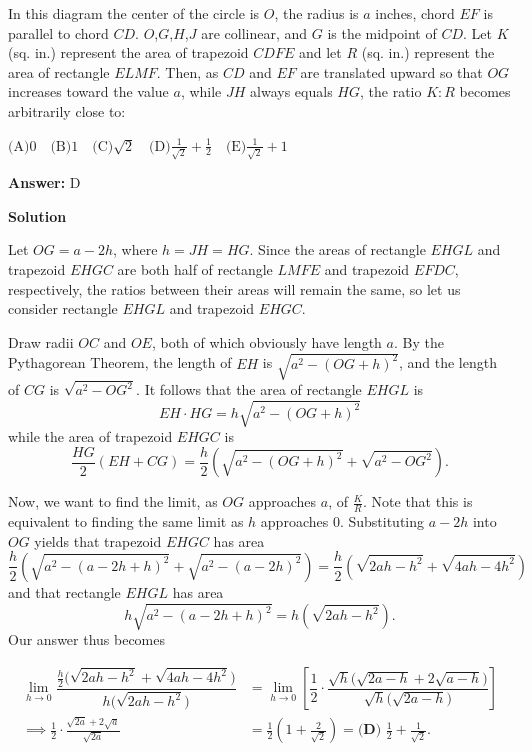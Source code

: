 \begin{enumerate}
 In this diagram the center of the circle is $O$, the radius is $a$ inches, chord $EF$ is parallel to chord $CD$. $O$,$G$,$H$,$J$ are collinear, and $G$ is the midpoint of $CD$. Let $K$ (sq. in.) represent the area of trapezoid $CDFE$ and let $R$ (sq. in.) represent the area of rectangle $ELMF.$ Then, as $CD$ and $EF$ are translated upward so that $OG$ increases toward the value $a$, while $JH$ always equals $HG$, the ratio $K:R$ becomes arbitrarily close to:


 $\text{(A)} 0\quad\text{(B)} 1\quad\text{(C)} \sqrt{2}\quad\text{(D)} \frac{1}{\sqrt{2}}+\frac{1}{2}\quad\text{(E)} \frac{1}{\sqrt{2}}+1$

 \textbf{Answer: }D



\textbf{Solution}

Let $OG = a - 2h$, where $h = JH = HG$. Since the areas of rectangle $EHGL$ and trapezoid $EHGC$ are both half of rectangle $LMFE$ and trapezoid $EFDC$, respectively, the ratios between their areas will remain the same, so let us consider rectangle $EHGL$ and trapezoid $EHGC$.

 Draw radii $OC$ and $OE$, both of which obviously have length $a$. By the Pythagorean Theorem, the length of $EH$ is $\sqrt{a^2 - (OG + h)^2}$, and the length of $CG$ is $\sqrt{a^2 - OG^2}$. It follows that the area of rectangle $EHGL$ is 
 \[EH\cdot HG = h\sqrt{a^2 - (OG + h)^2}\] while the area of trapezoid $EHGC$ is  
 \[\frac{HG}{2}(EH + CG)=\frac{h}{2}\left(\sqrt{a^2 - (OG + h)^2} + \sqrt{a^2 - OG^2}\right).\]

 Now, we want to find the limit, as $OG$ approaches $a$, of $\frac{K}{R}$. Note that this is equivalent to finding the same limit as $h$ approaches $0$. Substituting $a - 2h$ into $OG$ yields that trapezoid $EHGC$ has area 
 \[\frac{h}{2}\left(\sqrt{a^2 - (a - 2h + h)^2} + \sqrt{a^2 - (a - 2h)^2}\right) =\frac{h}{2}\left(\sqrt{2ah - h^2} + \sqrt{4ah - 4h^2}\right)\] and that rectangle $EHGL$ has area 
 \[h\sqrt{a^2 - (a - 2h + h)^2} = h\left(\sqrt{2ah - h^2}\right).\] Our answer thus becomes

 
 \begin{align*} \lim_{h\rightarrow 0}\dfrac{\frac{h}{2}\bigl(\sqrt{2ah - h^2} + \sqrt{4ah - 4h^2}\bigr)}{h\bigl(\sqrt{2ah - h^2}\bigr)} &= \lim_{h\rightarrow 0}\left[\dfrac{1}{2}\cdot\dfrac{\sqrt{h}\bigl(\sqrt{2a - h} + 2\sqrt{a - h}\bigr)}{\sqrt{h}\bigl(\sqrt{2a - h}\bigr)}\right] \\ \implies \frac{1}{2}\cdot\frac{\sqrt{2a} + 2\sqrt{a}}{\sqrt{2a}} &= \frac{1}{2}\left(1 + \frac{2}{\sqrt{2}}\right) = \boxed{\textbf{(D) }\frac{1}{2}+\frac{1}{\sqrt{2}}.} \end{align*}




\end{enumerate}